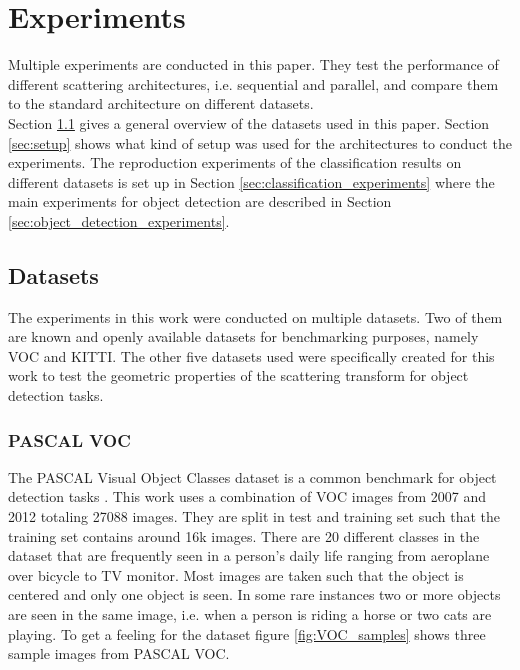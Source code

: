 \chapter{Experiments}
\label{chap:experiments}

Multiple experiments are conducted in this paper. They test the performance of different scattering architectures, i.e. sequential and parallel, and compare them to the standard architecture on different datasets. \\
Section \ref{sec:datasets} gives a general overview of the datasets used in this paper. Section \ref{sec:setup} shows what kind of setup was used for the architectures to conduct the experiments. The reproduction experiments of the classification results on different datasets is set up in Section \ref{sec:classification_experiments} where the main experiments for object detection are described in Section \ref{sec:object_detection_experiments}.

	
\section{Datasets}
\label{sec:datasets}

The experiments in this work were conducted on multiple datasets. Two of them are known and openly available datasets for benchmarking purposes, namely VOC and KITTI. The other five datasets used were specifically created for this work to test the geometric properties of the scattering transform for object detection tasks. 

\subsection{PASCAL VOC}

The PASCAL Visual Object Classes dataset is a common benchmark for object detection tasks \cite{VOC}. This work uses a combination of VOC images from 2007 and 2012 totaling 27088 images. They are split in test and training set such that the training set contains around 16k images. There are 20 different classes in the dataset that are frequently seen in a person's daily life ranging from aeroplane over bicycle to TV monitor. Most images are taken such that the object is centered and only one object is seen. In some rare instances two or more objects are seen in the same image, i.e. when a person is riding a horse or two cats are playing. To get a feeling for the dataset figure \ref{fig:VOC_samples} shows three sample images from PASCAL VOC.

